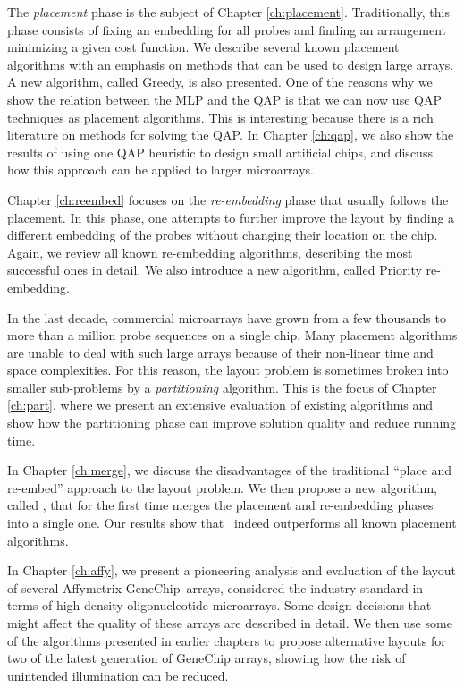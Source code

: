 The \emph{placement} phase is the subject of Chapter \ref{ch:placement}.
Traditionally, this phase consists of fixing an embedding for all probes and
finding an arrangement minimizing a given cost function. We describe several
known placement algorithms with an emphasis on methods that can be used to
design large arrays. A new algorithm, called Greedy, is also presented. One of
the reasons why we show the relation between the MLP and the QAP is that we can
now use QAP techniques as placement algorithms. This is interesting because
there is a rich literature on methods for solving the QAP. In Chapter
\ref{ch:qap}, we also show the results of using one QAP heuristic to design
small artificial chips, and discuss how this approach can be applied to larger
microarrays.

Chapter \ref{ch:reembed} focuses on the \emph{re-embedding} phase that usually
follows the placement. In this phase, one attempts to further improve the layout
by finding a different embedding of the probes without changing their location
on the chip. Again, we review all known re-embedding algorithms, describing the
most successful ones in detail. We also introduce a new algorithm, called
Priority re-embedding.

In the last decade, commercial microarrays have grown from a few thousands to
more than a million probe sequences on a single chip. Many placement algorithms
are unable to deal with such large arrays because of their non-linear time and
space complexities. For this reason, the layout problem is sometimes broken into
smaller sub-problems by a \emph{partitioning} algorithm. This is the focus of
Chapter \ref{ch:part}, where we present an extensive evaluation of existing
algorithms and show how the partitioning phase can improve solution quality and
reduce running time.

In Chapter \ref{ch:merge}, we discuss the disadvantages of the traditional ``place
and re-embed'' approach to the layout problem. We then propose a new algorithm,
called \Greedyplus, that for the first time merges the placement and re-embedding
phases into a single one. Our results show that \Greedyplus\ indeed outperforms
all known placement algorithms.

In Chapter \ref{ch:affy}, we present a pioneering analysis and evaluation of the
layout of several Affymetrix GeneChip\textR\ arrays, considered the industry
standard in terms of high-density oligonucleotide microarrays. Some design
decisions that might affect the quality of these arrays are described in detail.
We then use some of the algorithms presented in earlier chapters to propose
alternative layouts for two of the latest generation of GeneChip arrays, showing
how the risk of unintended illumination can be reduced.

